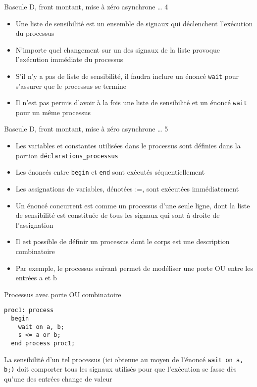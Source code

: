 \documentclass[presentation]{beamer}
\begin{document}
\begin{frame}[label={sec:org681026d},fragile]{Bascule D, front montant, mise à zéro asynchrone \ldots{} 4}
 \begin{itemize}
\item Une \alert{liste de sensibilité} est un ensemble de signaux qui déclenchent l'exécution du processus
\item N'importe quel changement sur un des signaux de la liste provoque l'exécution immédiate du processus
\item S'il n'y a pas de liste de sensibilité, il faudra inclure un énoncé \texttt{wait} pour s'assurer que le processus se termine
\item Il n'est pas permis d'avoir à la fois une liste de sensibilité et un énoncé \texttt{wait} pour un même processus
\end{itemize}
\end{frame}

\begin{frame}[label={sec:orgb596877},fragile]{Bascule D, front montant, mise à zéro asynchrone \ldots{} 5}
 \begin{itemize}
\item Les variables et constantes utilisées dans le processus sont définies dans la portion \texttt{déclarations\_processus}
\item Les énoncés entre \alert{\texttt{begin}} et \alert{\texttt{end}} sont exécutés séquentiellement
\item Les assignations de variables, dénotées :=, sont exécutées immédiatement
\item Un énoncé concurrent est comme un processus d'une seule ligne, dont la liste de sensibilité est constituée de tous les signaux qui sont à droite de l'assignation
\item Il est possible de définir un processus dont le corps est une description combinatoire
\item Par exemple, le processus suivant permet de modéliser une porte OU entre les entrées a et b
\end{itemize}
\end{frame}

\begin{frame}[label={sec:org56f7d11},fragile]{Processus avec porte OU combinatoire}
 \begin{verbatim}
proc1: process
  begin
    wait on a, b;
    s <= a or b;
  end process proc1;
\end{verbatim}

La sensibilité d'un tel processus (ici obtenue au moyen de l'énoncé \texttt{wait on a, b;)} doit comporter tous les signaux utilisés pour que l'exécution se fasse dès qu'une des entrées change de valeur
\end{frame}
\end{document}
